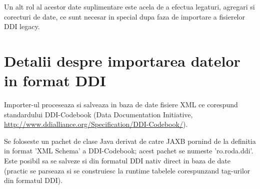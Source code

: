 Un alt rol al acestor date suplimentare este acela de a efectua legaturi, agregari si corecturi de date, ce sunt necesar in special dupa faza de importare a fisierelor DDI legacy.

\section{Detalii despre importarea datelor in format DDI}

Importer-ul proceseaza si salveaza in baza de date fisiere XML ce corespund standardului DDI-Codebook (Data Documentation Initiative, \url{http://www.ddialliance.org/Specification/DDI-Codebook/}).

Se foloseste un pachet de clase Java derivat de catre JAXB pornind de la definitia in format 'XML Schema' a DDI-Codebook; acest pachet se numeste 'ro.roda.ddi'.
Este posibil sa se salveze si din formatul DDI nativ direct in baza de date (practic se parseaza si se construiesc la runtime tabelele corespunzand tag-urilor din formatul DDI).


